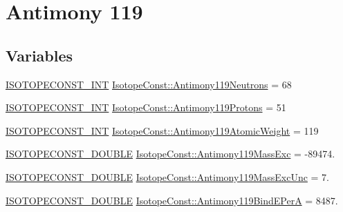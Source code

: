 \hypertarget{group___isotope_const-_antimony-_sb119}{}\section{Antimony 119}
\label{group___isotope_const-_antimony-_sb119}
\subsection*{Variables}
\begin{DoxyCompactItemize}
\item 
\mbox{\hyperlink{group___isotope_const-_macros_ga5f18360b3e99483a35c32d789e62621c}{I\+S\+O\+T\+O\+P\+E\+C\+O\+N\+S\+T\+\_\+\+I\+NT}} \mbox{\hyperlink{group___isotope_const-_antimony-_sb119_ga0e49c8d6e1aa88d6f35e41525424a849}{Isotope\+Const\+::\+Antimony119\+Neutrons}} = 68
\item 
\mbox{\hyperlink{group___isotope_const-_macros_ga5f18360b3e99483a35c32d789e62621c}{I\+S\+O\+T\+O\+P\+E\+C\+O\+N\+S\+T\+\_\+\+I\+NT}} \mbox{\hyperlink{group___isotope_const-_antimony-_sb119_gabb78c3afba249e66dd8cb4b48c40213c}{Isotope\+Const\+::\+Antimony119\+Protons}} = 51
\item 
\mbox{\hyperlink{group___isotope_const-_macros_ga5f18360b3e99483a35c32d789e62621c}{I\+S\+O\+T\+O\+P\+E\+C\+O\+N\+S\+T\+\_\+\+I\+NT}} \mbox{\hyperlink{group___isotope_const-_antimony-_sb119_ga173858e2493beef44cb951646d981f60}{Isotope\+Const\+::\+Antimony119\+Atomic\+Weight}} = 119
\item 
\mbox{\hyperlink{group___isotope_const-_macros_ga8f45a7272ce02c0b4c65c44636ed719a}{I\+S\+O\+T\+O\+P\+E\+C\+O\+N\+S\+T\+\_\+\+D\+O\+U\+B\+LE}} \mbox{\hyperlink{group___isotope_const-_antimony-_sb119_gaf94433c8409b534d6dd6d21797ea0f6f}{Isotope\+Const\+::\+Antimony119\+Mass\+Exc}} = -\/89474.
\item 
\mbox{\hyperlink{group___isotope_const-_macros_ga8f45a7272ce02c0b4c65c44636ed719a}{I\+S\+O\+T\+O\+P\+E\+C\+O\+N\+S\+T\+\_\+\+D\+O\+U\+B\+LE}} \mbox{\hyperlink{group___isotope_const-_antimony-_sb119_gad0df39565d722617c15c2f0d34ace034}{Isotope\+Const\+::\+Antimony119\+Mass\+Exc\+Unc}} = 7.
\item 
\mbox{\hyperlink{group___isotope_const-_macros_ga8f45a7272ce02c0b4c65c44636ed719a}{I\+S\+O\+T\+O\+P\+E\+C\+O\+N\+S\+T\+\_\+\+D\+O\+U\+B\+LE}} \mbox{\hyperlink{group___isotope_const-_antimony-_sb119_ga20e4263c03b32eecc8d3ee7f3dc00a13}{Isotope\+Const\+::\+Antimony119\+Bind\+E\+PerA}} = 8487.
\item 

\end{DoxyCompactItemize}
